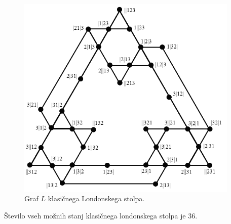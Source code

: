 \documentclass[twoside,11pt]{article}
\begin{document}
\begin{figure}[h!]
    \includegraphics[width=300pt]{img/classic-tolgraph.png}
    \caption{Graf $L$ klasičnega Londonskega stolpa.}
    \label{fig:tolgraph}
\end{figure}

\begin{lema}
    \label{lem:stanja-klas-lond}
    Število vseh možnih stanj klasičnega londonskega stolpa je 36.
\end{lema}

%    
\end{document}
